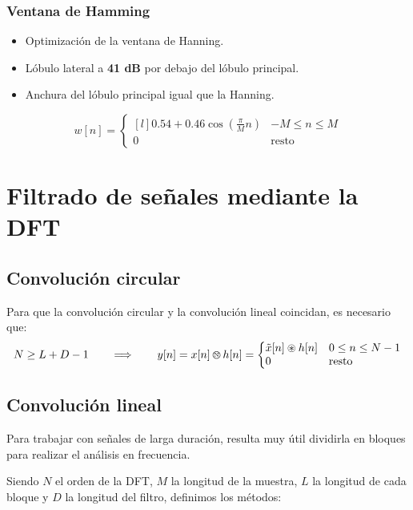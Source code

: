 \documentclass[a4paper,oneside]{book}
\begin{document}
\begin{multicols}{2}
	\subsubsection{Ventana de Hamming}\vspace{\parskip}
	\begin{itemize}
		\item Optimización de la ventana de Hanning.
		\item Lóbulo lateral a \textbf{41 dB} por debajo del lóbulo principal.
		\item Anchura del lóbulo principal igual que la Hanning.
	\end{itemize}
	\[ w[n] = \left\lbrace
	\begin{matrix*}[l]
		\displaystyle{0.54 + 0.46\cos \left( \frac{\pi}{M}n \right)} & -M\leq n \leq M\\
		0 & \textrm{resto}
	\end{matrix*} \right. \]
	\vspace*{\fill}
\end{multicols}

\section{Filtrado de señales mediante la DFT}

\subsection{Convolución circular}

Para que la convolución circular y la convolución lineal coincidan, es necesario que:
\[ N \geq L+D-1 \qquad \Longrightarrow \qquad y[n]=x[n] \circConvUnknown h[n] = \left\lbrace 
\begin{matrix*}[l]
	\tilde{x}[n] \circledast h[n] & 0 \leq n \leq N-1\\ 
	0 & \textrm{resto}
\end{matrix*} \right.\]

\subsection{Convolución lineal}

Para trabajar con señales de larga duración, resulta muy útil dividirla en bloques para realizar el análisis en frecuencia.

Siendo $N$ el orden de la DFT, $M$ la longitud de la muestra, $L$ la longitud de cada bloque y $D$ la longitud del filtro, definimos los métodos:
\end{document}
